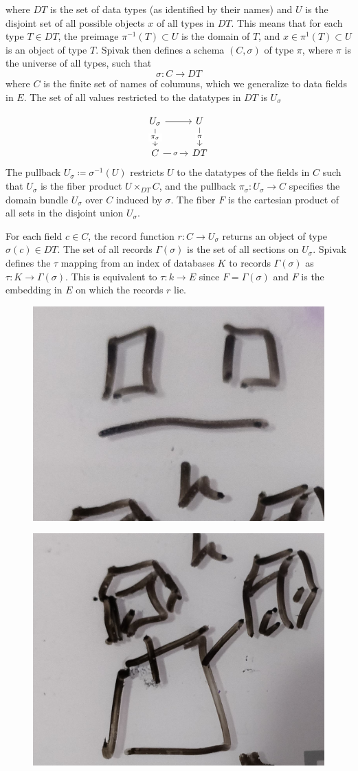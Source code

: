 \documentclass[../main.tex]{subfiles}
\begin{document}
where $DT$ is the set of data types (as identified by their names) and $U$ is the disjoint set of all possible objects $x$ of all types in $DT$. This means that for each type $T\in DT$, the preimage $\pi^{-1}(T)\subset U $ is the domain of $T$, and $x \in \pi^{1}(T)\subset U$ is an object of type $T$. Spivak then defines a schema $(C, \sigma)$ of type $\pi$, where $\pi$ is the universe of all types, such that 
\begin{equation}
\sigma: C \rightarrow DT
\end{equation}
where $C$ is the finite set of names of columuns, which we generalize to data fields in $E$. The set of all values restricted to the datatypes in $DT$ is $U_{\sigma}$

\begin{equation}
    \begin{tikzcd}
            U_{\sigma} \arrow[d, "\pi_{\sigma}" description] \arrow[r] & U \arrow[d, "\pi" description] \\
            C \arrow[r, "\sigma" description]                          & DT                            
    \end{tikzcd}
\end{equation}
The pullback $U_{\sigma} \coloneqq \sigma^{-1}(U)$ restricts $U$ to the datatypes of the fields in $C$ such that $U_{\sigma}$ is the fiber product $U \times_{DT} C$, and the pullback $\pi_{\sigma}:U_{\sigma} \rightarrow C$ specifies the domain bundle $U_{\sigma}$ over $C$ induced by $\sigma$. The fiber $F$ is the cartesian product of all sets in the disjoint union $U_{\sigma}$. 

For each field $c \in C$, the record function $r: C \rightarrow U_{\sigma}$ returns an object of type $\sigma(c) \in DT$. The set of all records $\Gamma(\sigma)$ is the set of all sections on $U_\sigma$. Spivak defines the $\tau$ mapping from an index of databases $K$ to records $\Gamma(\sigma)$ as $\tau: K \rightarrow \Gamma(\sigma)$. This is equivalent to $\tau: k \rightarrow E$ since $F = \Gamma(\sigma)$ and $F$ is the embedding in $E$ on which the records $r$ lie.
 

\begin{figure}[ht]
    \includegraphics[width=0.2\linewidth]{figures/sections/math/temp_2f.png}
    \label{fig:}
\end{figure}
\begin{figure}[ht]
    \includegraphics[width=0.2\linewidth]{figures/sections/math/temp_3f.png}
\end{figure}
\end{document}
